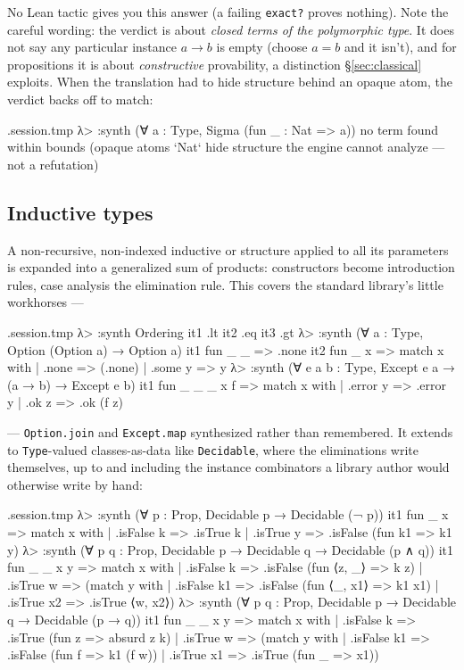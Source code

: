 \documentclass[11pt,oneside]{article}
\newcommand{\code}[1]{\texttt{#1}}
\newenvironment{session}
 {\VerbatimEnvironment\begin{VerbatimOut}{\jobname.session.tmp}}
 {\end{VerbatimOut}%
  \begin{sessionouter}%
  \VerbatimInput[fontsize=\footnotesize, breaklines=true,
    breaksymbolleft={\textcolor{stone}{\footnotesize$\hookrightarrow$}},
    formatcom=\color{ink}, tabsize=4]{\jobname.session.tmp}%
  \end{sessionouter}}
\begin{document}
No Lean tactic gives you this answer (a failing \code{exact?} proves
nothing). Note the careful wording: the verdict is about \emph{closed
terms of the polymorphic type}. It does not say any particular
instance $a \to b$ is empty (choose $a = b$ and it isn't), and
for propositions it is about \emph{constructive} provability, a
distinction \S\ref{sec:classical} exploits. When the translation had
to hide structure behind an opaque atom, the verdict backs off to
match:

\begin{session}
λ> :synth (∀ a : Type, Sigma (fun _ : Nat => a))
no term found within bounds (opaque atoms `Nat` hide structure the engine cannot analyze — not a refutation)
\end{session}

\subsection{Inductive types}\label{sec:inductives}

A non-recursive, non-indexed inductive or structure applied to all its
parameters is expanded into a generalized sum of products:
constructors become introduction rules, case analysis the elimination
rule. This covers the standard library's little workhorses ---

\begin{session}
λ> :synth Ordering
  it1  .lt
  it2  .eq
  it3  .gt
λ> :synth (∀ a : Type, Option (Option a) → Option a)
  it1  fun _ _ => .none
  it2  fun _ x => match x with | .none => (.none) | .some y => y
λ> :synth (∀ e a b : Type, Except e a → (a → b) → Except e b)
  it1  fun _ _ _ x f => match x with | .error y => .error y | .ok z => .ok (f z)
\end{session}

--- \code{Option.join} and \code{Except.map} synthesized rather than
remembered. It extends to \code{Type}-valued classes-as-data like
\code{Decidable}, where the eliminations write themselves, up to and
including the instance combinators a library author would otherwise
write by hand:

\begin{session}
λ> :synth (∀ p : Prop, Decidable p → Decidable (¬ p))
  it1  fun _ x => match x with | .isFalse k => .isTrue k | .isTrue y => .isFalse (fun k1 => k1 y)
λ> :synth (∀ p q : Prop, Decidable p → Decidable q → Decidable (p ∧ q))
  it1  fun _ _ x y => match x with | .isFalse k => .isFalse (fun ⟨z, _⟩ => k z) | .isTrue w => (match y with | .isFalse k1 => .isFalse (fun ⟨_, x1⟩ => k1 x1) | .isTrue x2 => .isTrue ⟨w, x2⟩)
λ> :synth (∀ p q : Prop, Decidable p → Decidable q → Decidable (p → q))
  it1  fun _ _ x y => match x with | .isFalse k => .isTrue (fun z => absurd z k) | .isTrue w => (match y with | .isFalse k1 => .isFalse (fun f => k1 (f w)) | .isTrue x1 => .isTrue (fun _ => x1))
\end{session}
\end{document}
